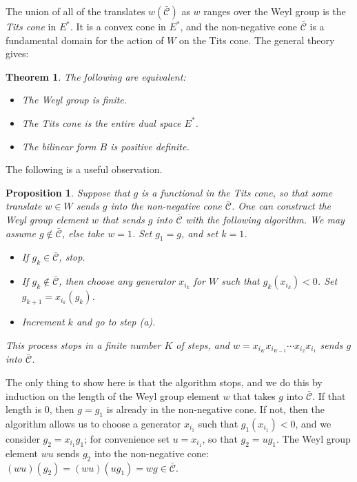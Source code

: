 \documentclass[12pt]{article}
\numberwithin{equation}{section}
\newtheorem{theorem}[equation]{Theorem}
\newtheorem{proposition}[equation]{Proposition}
\numberwithin{equation}{section}
\numberwithin{subeq}{equation}
\begin{document}
The union of all of the translates $w(\bar{\mathcal{C}})$ as $w$ ranges over the Weyl group
is the \emph{Tits cone} in $E^*$.
It is a convex cone in $E^*$,
and the non-negative cone $\bar{\mathcal{C}}$ is a fundamental domain for the action of $W$ on the Tits cone.
The general theory gives:

\begin{theorem}\label{FiniteWeyl}
The following are equivalent:
\begin{itemize}
\item The Weyl group is finite.
\item The Tits cone is the entire dual space $E^*$.
\item The bilinear form $B$ is positive definite.
\end{itemize}
\end{theorem}

The following is a useful observation.

\begin{proposition}\label{TitsAlgorithm}
Suppose that $g$ is a functional in the Tits cone,
so that some translate $w \in W$ sends $g$ into the non-negative cone $\bar{\mathcal{C}}$.
One can construct the Weyl group element $w$ that sends $g$ into $\bar{\mathcal{C}}$
with the following algorithm.
We may assume $g \notin \bar{\mathcal{C}}$, else take $w=1$.
Set $g_1 = g$, and set $k=1$.
\begin{itemize}
\item[(a)] If $g_k \in \bar{\mathcal{C}}$, stop.
\item[(b)] If $g_k \notin \bar{\mathcal{C}}$,
then choose any generator $x_{i_k}$ for $W$ such that $g_k(x_{i_k}) < 0$.
Set $g_{k+1} = x_{i_k}(g_k)$.
\item[(c)] Increment $k$ and go to step (a).
\end{itemize}
This process stops in a finite number $K$ of steps,
and $w = x_{i_{K}}x_{i_{K-1}}\cdots x_{i_2}x_{i_1}$ sends $g$ into $\bar{\mathcal{C}}$.
\end{proposition}

\medskip{}
The only thing to show here is that the algorithm stops,
and we do this by induction on the length of the Weyl group element $w$ that takes $g$ into $\bar{\mathcal{C}}$.
If that length is $0$, then $g=g_1$ is already in the non-negative cone.
If not, then the algorithm allows us to choose a generator $x_{i_1}$ such that $g_1(x_{i_1}) < 0$,
and we consider $g_2 = x_{i_1}g_1$;
for convenience set $u = x_{i_1}$, so that $g_2 = u g_1$.
The Weyl group element $w u$ sends $g_2$ into the non-negative cone:
$(w u)(g_2) = (w u)(ug_1) = w g \in \bar{\mathcal{C}}$.
\end{document}
